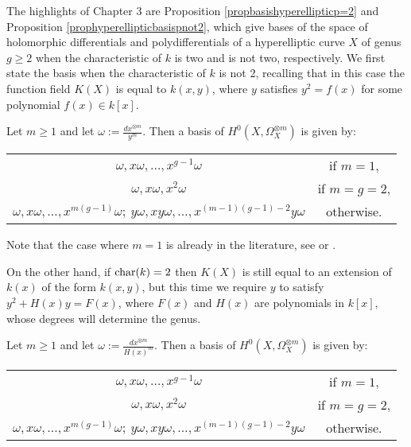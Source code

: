 The highlights of Chapter 3 are Proposition \ref{propbasishyperellipticp=2} and Proposition \ref{prophyperellipticbasispnot2}, which give bases of the space of holomorphic differentials and polydifferentials of a hyperelliptic curve $X$ of genus $g \geq 2$ when the characteristic of $k$ is two and is not two, respectively.
We first state the basis when the characteristic of $k$ is not 2, recalling that in this case the function field $K(X)$ is equal to $k(x,y)$, where $y$ satisfies $y^2 = f(x)$ for some polynomial $f(x) \in k[x]$.
    \begin{unnumprop}
    Let $m\geq 1$ and let $\omega := \frac{dx^{\otimes m}}{y^m}$. 
    Then a basis of $H^0(X,\Omega_X^{\otimes m})$ is given by:
        {\centering 
        \begin{tabular}{c c}
        $\omega, x\omega, \ldots , x^{g-1}\omega$ &  if $m=1$, \\
        $\omega, x\omega, x^2\omega$  &  if $m=g=2$, \\
        $\omega, x\omega, \ldots, x^{m(g-1)}\omega;\  y\omega, xy\omega, \ldots, x^{(m-1)(g-1)-2}y\omega$ &  otherwise.
        \end{tabular}\par
        }
    \end{unnumprop}
    
Note that the case where $m=1$ is already in the literature, see \cite[Prop. 7.4.26]{liu} or \cite[Ch. IV, \S 4, Prop. 4.3]{griffiths}.
 
On the other hand, if $\operatorname{char}(k) = 2$ then $K(X)$ is still equal to an extension of $k(x)$ of the form $k(x,y)$, but this time we require $y$ to satisfy $y^2 + H(x)y = F(x)$, where $F(x)$ and $H(x)$ are polynomials in $k[x]$, whose degrees will determine the genus.
    \begin{unnumprop}
    Let $m\geq 1$ and let $\omega:= \frac{dx^{\otimes m}}{H(x)^m}$. 
    Then a basis of $H^0(X,\Omega_X^{\otimes m})$ is given by:\\
        {\centering
        \begin{tabular}{c c}
        $\omega, x\omega, \ldots , x^{g-1}\omega$ &  if $m=1$, \\
        $\omega, x\omega, x^2\omega$ & if $m=g=2$, \\
        $\omega, x\omega, \ldots, x^{m(g-1)}\omega;\  y\omega, xy\omega, \ldots, x^{(m-1)(g-1)-2}y\omega$ & otherwise.
        \end{tabular}\par
        }
    \end{unnumprop}
    

